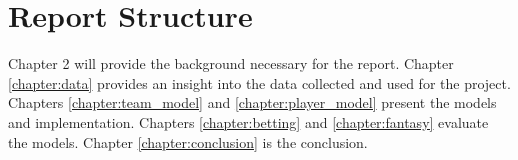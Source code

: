\section{Report Structure}
Chapter 2 will provide the background necessary for the report.  Chapter \ref{chapter:data} provides an insight into the data collected and used for the project.  Chapters \ref{chapter:team_model} and \ref{chapter:player_model} present the models and implementation.  Chapters \ref{chapter:betting} and \ref{chapter:fantasy} evaluate the models. Chapter \ref{chapter:conclusion} is the conclusion.